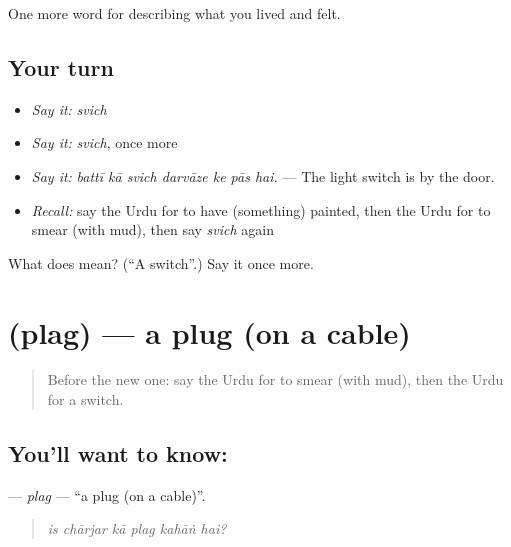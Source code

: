 \begin{grammarlens}[title={What you've built}]
One more word for describing what you lived and felt.
\end{grammarlens}

\subsection*{Your turn}
\begin{itemize}
\raggedright
  \item \emph{Say it:} \emph{svich}
  \item \emph{Say it:} \emph{svich}, once more
  \item \emph{Say it:} \emph{battī kā svich darvāze ke pās hai.} — The light switch is by the door.
  \item \emph{Recall:} say the Urdu for to have (something) painted, then the Urdu for to smear (with mud), then say \emph{svich} again
\end{itemize}

\begin{tcolorbox}[breakable,colback=teal!4,colframe=teal!35!black,title={Before you move on}]
What does  mean? (\textquotedblleft{}A switch\textquotedblright{}.) Say it once more.
\end{tcolorbox}
\section[\texorpdfstring{\ur{پلگ} (plag)}{پلگ (plag)}]{ (plag) — a plug (on a cable)}

\label{lesson:UR-C504-plag}



\begin{quote}
Before the new one: say the Urdu for to smear (with mud), then the Urdu for a switch.
\end{quote}

\subsection*{You'll want to know: }
\textbf{} — \emph{plag} — \textquotedblleft{}a plug (on a cable)\textquotedblright{}.

\begin{quote}
     
\end{quote}

\begin{quote}
\emph{is chārjar kā plag kahāṅ hai?}
\end{quote}

